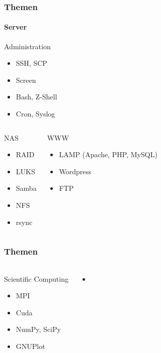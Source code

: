 \documentclass[utf8]{beamer}
\begin{document}
\begin{frame}
\frametitle{Themen}
\framesubtitle{Server}

\begin{block}{Administration}
  \begin{itemize}
  \item SSH, SCP
  \item Screen
  \item Bash, Z-Shell
  \item Cron, Syslog
  \end{itemize}
\end{block}

\begin{columns}
\begin{block}{NAS}
  \begin{itemize}
  \item RAID
  \item LUKS
  \item Samba
  \item NFS
  \item rsync
  \end{itemize}
\end{block}

\begin{block}{WWW}
  \begin{itemize}
  \item LAMP (Apache, PHP, MySQL)
  \item Wordpress
  \item FTP
  \end{itemize}
\end{block}
\end{columns}
\end{frame}

\begin{frame}
\frametitle{Themen}
\framesubtitle{}
\begin{columns}
\begin{block}{Scientific Computing}
  \begin{itemize}
  \item MPI
  \item Cuda
  \item NumPy, SciPy
  \item GNUPlot
  \end{itemize}
\end{block}

\begin{block}{}
  \begin{itemize}
      \item
  \end{itemize}
\end{block}
\end{columns}
\end{frame}
\end{document}
